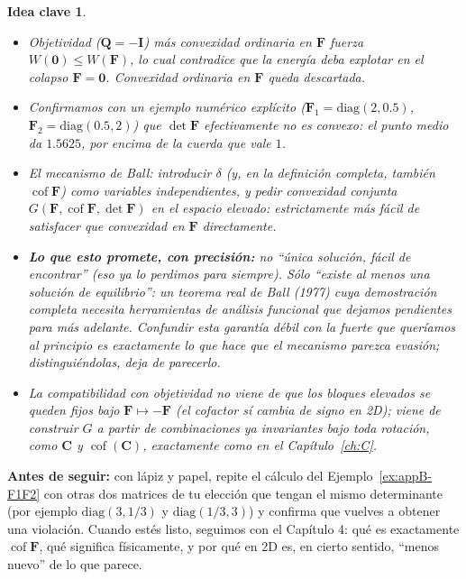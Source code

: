 \documentclass[11pt,a4paper]{article}
\newtheorem{takeaway}{Idea clave}
\newcommand{\Cof}{\operatorname{cof}}
\begin{document}
\begin{takeaway}
\begin{itemize}
\item Objetividad ($\bm Q=-\bm I$) m\'as convexidad ordinaria en
$\bm F$ fuerza $W(\bm 0)\leq W(\bm F)$, lo cual contradice que la
energ\'ia deba explotar en el colapso $\bm F=\bm 0$. Convexidad
ordinaria en $\bm F$ queda descartada.
\item Confirmamos con un ejemplo num\'erico expl\'icito
($\bm F_1=\mathrm{diag}(2,0.5)$, $\bm F_2=\mathrm{diag}(0.5,2)$) que
$\det\bm F$ efectivamente no es convexo: el punto medio da $1.5625$,
por encima de la cuerda que vale $1$.
\item El mecanismo de Ball: introducir $\delta$ (y, en la definici\'on
completa, tambi\'en $\Cof\bm F$) como variables \emph{independientes},
y pedir convexidad conjunta $G(\bm F,\Cof\bm F,\det\bm F)$ en el
espacio elevado: estrictamente m\'as f\'acil de satisfacer que
convexidad en $\bm F$ directamente.
\item \textbf{Lo que esto promete, con precisi\'on:} no ``\'unica
soluci\'on, f\'acil de encontrar'' (eso ya lo perdimos para siempre).
S\'olo ``existe al menos una soluci\'on de equilibrio'': un teorema
real de Ball (1977) cuya demostraci\'on completa necesita herramientas
de an\'alisis funcional que dejamos pendientes para m\'as adelante.
Confundir esta garant\'ia d\'ebil con la fuerte que quer\'iamos al
principio es exactamente lo que hace que el mecanismo parezca
evasi\'on; distingui\'endolas, deja de parecerlo.
\item La compatibilidad con objetividad no viene de que los bloques
elevados se queden fijos bajo $\bm F\mapsto-\bm F$ (el cofactor
\emph{s\'i} cambia de signo en 2D); viene de construir $G$ a partir
de combinaciones ya invariantes bajo \emph{toda} rotaci\'on, como
$\bm C$ y $\Cof(\bm C)$, exactamente como en el
Cap\'itulo~\ref{ch:C}.
\end{itemize}
\end{takeaway}

\bigskip
\noindent\textbf{Antes de seguir:} con l\'apiz y papel, repite el
c\'alculo del Ejemplo~\ref{ex:appB-F1F2} con otras dos matrices de tu
elecci\'on que tengan el mismo determinante (por ejemplo
$\mathrm{diag}(3,1/3)$ y $\mathrm{diag}(1/3,3)$) y confirma que vuelves
a obtener una violaci\'on. Cuando est\'es listo, seguimos con el
Cap\'itulo 4: qu\'e es exactamente $\Cof\bm F$, qu\'e significa
f\'isicamente, y por qu\'e en 2D es, en cierto sentido, ``menos nuevo''
de lo que parece.
\end{document}
